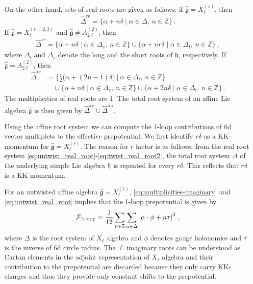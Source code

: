 On the other hand, sets of real roots are given as follows: if $ \hat{\mathfrak{g}} = X_\ell^{(1)} $, then
\begin{align}\label{eq:untwist_real_root}
\hat{\Delta}^{\mathrm{re}} = \{ \alpha + n \delta \mid \alpha \in \Delta,\ n \in \mathbb{Z} \} \, .
\end{align}
If $ \hat{\mathfrak{g}} = X_\ell^{(r = 2, 3)} $ and $ \hat{\mathfrak{g}} \neq A_{2\ell}^{(2)} $, then
\begin{align}\label{eq:twist_real_root}
\hat{\Delta}^{\mathrm{re}} = \{ \alpha + n \delta \mid \alpha \in \Delta_s,\ n \in \mathbb{Z} \}  \cup \{\alpha + nr\delta \mid \alpha \in \Delta_l,\ n \in \mathbb{Z} \}\ ,
\end{align}
where $ \Delta_l $ and $ \Delta_s $ denote the long and the short roots of $ \mathfrak{h} $, respectively. If $ \hat{\mathfrak{g}} = A_{2\ell}^{(2)} $, then
\begin{align}\label{eq:twist_real_root2}
\hat{\Delta}^{\mathrm{re}}
&= \Big\{ \frac{1}{2} \big(\alpha + (2n-1)\delta \big)\ \Big\vert\  \alpha \in \Delta_l,\ n \in \mathbb{Z} \Big\} \nonumber \\
& \quad \cup \{\alpha + n\delta \mid \alpha \in \Delta_s,\ n \in \mathbb{Z} \} \cup \{\alpha + 2n\delta \mid \alpha \in \Delta_l,\ n \in \mathbb{Z} \} \, .
\end{align}
The multiplicities of real roots are $ 1 $. The total root system of an affine Lie algebra $ \hat{\mathfrak{g}} $ is then given by $ \hat{\Delta}^{\mathrm{re}} \cup \hat{\Delta}^{\mathrm{im}} $.

Using the affine root system we can compute the 1-loop contributions of 6d vector multiplets to the effective prepotential. We first identify $ r\delta $ as a KK-momentum for $ \hat{\mathfrak{g}} = X_\ell^{(r)} $. The reason for $ r $ factor is as follows: from the real root system \eqref{eq:untwist_real_root}-\eqref{eq:twist_real_root2}, the total root system $ \Delta $ of the underlying simple Lie algebra $ \mathfrak{h} $ is repeated for every $ r \delta $. This reflects that $ r \delta $ is a KK-momentum.

For an untwisted affine algebra $ \hat{\mathfrak{g}} = X_\ell^{(1)} $, \eqref{eq:multiplicities-imaginary} and \eqref{eq:untwist_real_root} implies that the 1-loop prepotential is given by
\begin{align}
\mathcal{F}_{\text{1-loop}} = \frac{1}{12} \sum_{n \in \mathbb{Z}} \sum_{\alpha \in \Delta} \abs{\alpha \cdot \phi + n \tau}^3\ ,
\end{align}
where $ \Delta $ is the root system of $ X_\ell $ algebra and $\phi$ denotes gauge holonomies and $\tau$ is the inverse of 6d circle radius. The $\ell$ imaginary roots can be understood as Cartan elements in the adjoint representation of $X_\ell$ algebra and their contribution to the prepotential are discarded because they only carry KK-charges and thus they provide only constant shifts to the prepotential.

